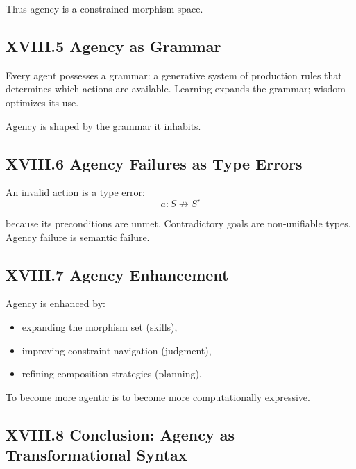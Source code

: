 \documentclass[12pt,letterpaper]{article}
\begin{document}
Thus agency is a constrained morphism space.

\subsection{XVIII.5 Agency as Grammar}

Every agent possesses a grammar: a generative system of production rules that determines which actions are available. Learning expands the grammar; wisdom optimizes its use.

Agency is shaped by the grammar it inhabits.

\subsection{XVIII.6 Agency Failures as Type Errors}

An invalid action is a type error:
\[
a : S \not\to S'
\]

because its preconditions are unmet. Contradictory goals are non-unifiable types. Agency failure is semantic failure.

\subsection{XVIII.7 Agency Enhancement}

Agency is enhanced by:

\begin{itemize}
    \item expanding the morphism set (skills),
    \item improving constraint navigation (judgment),
    \item refining composition strategies (planning).
\end{itemize}

To become more agentic is to become more computationally expressive.

\subsection{XVIII.8 Conclusion: Agency as Transformational Syntax}
\end{document}
